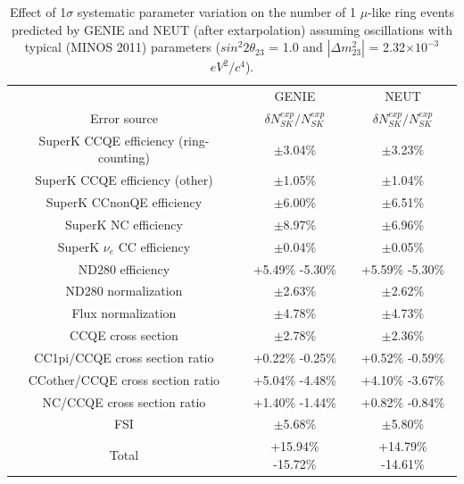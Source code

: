 \begin{table}[htb]
\center
\renewcommand{\arraystretch}{1.75} %
\begin{tabular}{|c|c|c|}
\hline
       & GENIE & NEUT \\
Error source  &
  $\delta{N^{exp}_{SK}}/N^{exp}_{SK}$  &
  $\delta{N^{exp}_{SK}}/N^{exp}_{SK}$  \\
\hline
SuperK CCQE efficiency (ring-counting)  &   $\pm$3.04\%       &   $\pm$3.23\%       \\
SuperK CCQE efficiency (other)          &   $\pm$1.05\%       &   $\pm$1.04\%       \\
SuperK CCnonQE efficiency               &   $\pm$6.00\%       &   $\pm$6.51\%       \\
SuperK NC efficiency                    &   $\pm$8.97\%       &   $\pm$6.96\%       \\
SuperK $\nu_{e}$ CC efficiency          &   $\pm$0.04\%       &   $\pm$0.05\%       \\
ND280 efficiency                        &   +5.49\% -5.30\%   &   +5.59\% -5.30\%   \\
ND280 normalization                     &   $\pm$2.63\%       &   $\pm$2.62\%       \\
Flux normalization                      &   $\pm$4.78\%       &   $\pm$4.73\%       \\
CCQE cross section                      &   $\pm$2.78\%       &   $\pm$2.36\%       \\
CC1pi/CCQE cross section ratio          &   +0.22\% -0.25\%   &   +0.52\% -0.59\%   \\
CCother/CCQE cross section ratio        &   +5.04\% -4.48\%   &   +4.10\% -3.67\%   \\ 
NC/CCQE cross section ratio             &   +1.40\% -1.44\%   &   +0.82\% -0.84\%   \\
FSI                                     &   $\pm$5.68\%       &   $\pm$5.80\%       \\
\hline
Total                                   &   +15.94\% -15.72\% &   +14.79\% -14.61\% \\
\hline
\end{tabular}\\[2pt]
\caption{
  Effect of 1$\sigma$ systematic parameter variation on the number of 1 $\mu$-like ring events
  predicted by GENIE and NEUT (after extarpolation)
  assuming oscillations with typical (MINOS 2011) parameters
  ($sin^{2}2\theta_{23}$ = 1.0 and $|\Delta m^{2}_{23}|$ = 2.32$\times10^{-3}$ $eV^{2}/c^{4}$).
}
\label{table:dnsk_minos11}
\end{table}


